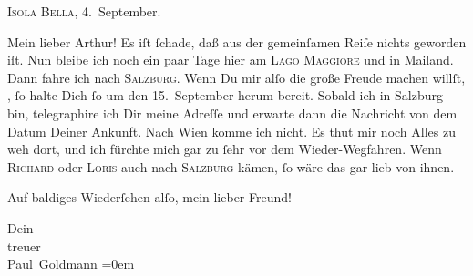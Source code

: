 \pstart
           \centering{}\textsc{Isola Bella}, 4. September.\pend
           
\pstart\center{}Mein lieber Arthur!\pend\vspace{0.5em}
\pstart
           Es iſt{ }ſchade, daß aus der gemeinſamen Reiſe nichts geworden iſt. Nun bleibe ich noch
               ein paar Tage hier am \textsc{Lago Maggiore} und in Mailand. Dann fahre ich nach \textsc{Salzburg}. Wenn Du mir alſo die große Freude machen willſt, \label{K_L02714-1v}\label{K_L02714-1},{ }ſo halte Dich{ }ſo um den 15. September herum
               bereit. {\pb}Sobald ich in Salzburg bin, telegraphire ich Dir meine Adreſſe und \strikeout{\textcolor{gray}{×}} erwarte dann die Nachricht von dem Datum Deiner Ankunft. Nach Wien komme ich nicht. Es thut mir noch Alles zu weh dort, und
               ich fürchte mich gar zu{ }ſehr vor dem Wieder-Wegfahren. Wenn \textsc{Richard} oder \textsc{Loris} auch nach \textsc{Salzburg} kämen,{ }ſo wäre das gar lieb von ihnen.\pend
           
\pstart
           Auf baldiges Wiederſehen alſo, mein lieber Freund!\pend
           
\pstart
           Dein {\\[\baselineskip]}treuer {\\[\baselineskip]}\spacefill\mbox{Paul Goldmann}\pend
           \leftskip=0em{}\endnumbering{}  \newcommand{\dateiname}{L02714}\newcommand{\titel}{Paul Goldmann an Arthur Schnitzler, 4. 9. [1893]}\newcommand{\editorInnen}{Martin Anton Müller und Laura Untner}

